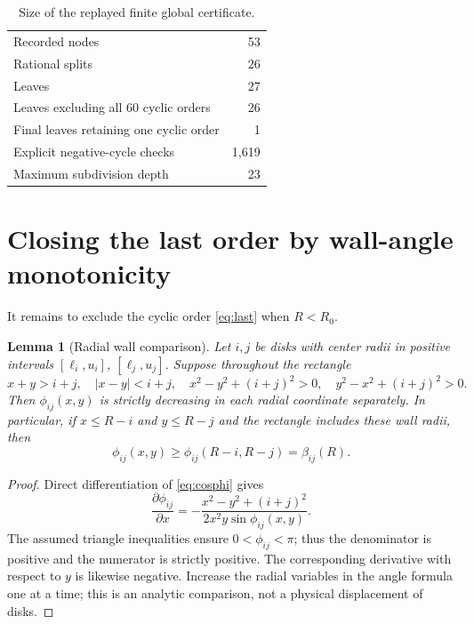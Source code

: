 \documentclass[10pt,a4paper]{article}
\newtheorem{lemma}[theorem]{Lemma}
\newcommand{\Rcrit}{R_0}
\begin{document}
\begin{table}[htbp]\centering\small
\caption{Size of the replayed finite global certificate.}\label{tab:tree}
\begin{tabular}{lr}\toprule
Recorded nodes & 53\\
Rational splits & 26\\
Leaves & 27\\
Leaves excluding all 60 cyclic orders & 26\\
Final leaves retaining one cyclic order & 1\\
Explicit negative-cycle checks & 1,619\\
Maximum subdivision depth & 23\\
\bottomrule\end{tabular}
\end{table}

\section{Closing the last order by wall-angle monotonicity}\label{sec:barrier}
It remains to exclude the cyclic order \eqref{eq:last} when $R<\Rcrit$.

\begin{lemma}[Radial wall comparison]\label{lem:wall}
Let $i,j$ be disks with center radii in positive intervals
$[\ell_i,u_i]$, $[\ell_j,u_j]$. Suppose throughout the rectangle
\[
 x+y>i+j,\quad |x-y|<i+j,\quad
 x^2-y^2+(i+j)^2>0,\quad y^2-x^2+(i+j)^2>0.
\]
Then $\phi_{ij}(x,y)$ is strictly decreasing in each radial coordinate separately. In particular, if $x\le R-i$ and $y\le R-j$ and the rectangle includes these wall radii, then
\begin{equation}\label{eq:wall}
 \phi_{ij}(x,y)\ge\phi_{ij}(R-i,R-j)=\beta_{ij}(R).
\end{equation}
\end{lemma}
\begin{proof}
Direct differentiation of \eqref{eq:cosphi} gives
\begin{equation}\label{eq:derivative}
 \frac{\partial\phi_{ij}}{\partial x}
 =-\frac{x^2-y^2+(i+j)^2}{2x^2y\sin\phi_{ij}(x,y)}.
\end{equation}
The assumed triangle inequalities ensure $0<\phi_{ij}<\pi$; thus the denominator is positive and the numerator is strictly positive. The corresponding derivative with respect to $y$ is likewise negative. Increase the radial variables in the angle formula one at a time; this is an analytic comparison, not a physical displacement of disks.
\end{proof}
\end{document}

